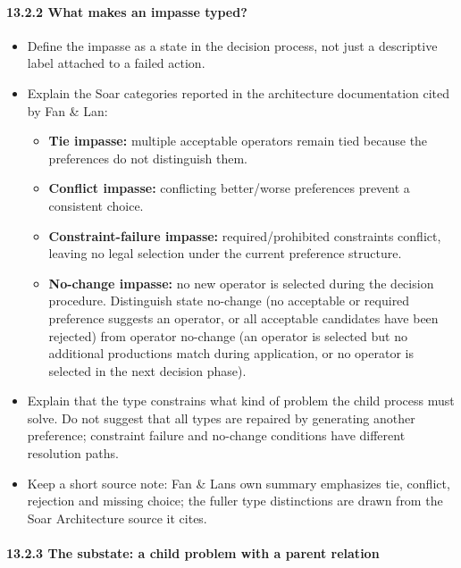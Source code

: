 \paragraph{13.2.2 What makes an impasse typed?}\label{1322-what-makes-an-impasse-typed}

\begin{itemize}
\tightlist
\item
  Define the impasse as a state in the decision process, not just a descriptive label attached to a failed action.
\item
  Explain the Soar categories reported in the architecture documentation cited by Fan \& Lan:

  \begin{itemize}
  \tightlist
  \item
    \textbf{Tie impasse:} multiple acceptable operators remain tied because the preferences do not distinguish them.
  \item
    \textbf{Conflict impasse:} conflicting better/worse preferences prevent a consistent choice.
  \item
    \textbf{Constraint-failure impasse:} required/prohibited constraints conflict, leaving no legal selection under the current preference structure.
  \item
    \textbf{No-change impasse:} no new operator is selected during the decision procedure. Distinguish state no-change (no acceptable or required preference suggests an operator, or all acceptable candidates have been rejected) from operator no-change (an operator is selected but no additional productions match during application, or no operator is selected in the next decision phase).
  \end{itemize}
\item
  Explain that the type constrains what kind of problem the child process must solve. Do not suggest that all types are repaired by generating another preference; constraint failure and no-change conditions have different resolution paths.
\item
  Keep a short source note: Fan \& Lan\textquotesingle s own summary emphasizes tie, conflict, rejection and missing choice; the fuller type distinctions are drawn from the Soar Architecture source it cites.
\end{itemize}

\paragraph{13.2.3 The substate: a child problem with a parent relation}\label{1323-the-substate-a-child-problem-with-a-parent-relation}

